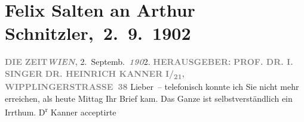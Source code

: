 

         
         \renewcommand{\erwaehntePersonen}{Personen: Heinrich Kanner, Felix Salten, Isidor Singer}
         \renewcommand{\erwaehnteInstitutionen}{Institutionen: Die Zeit}
         \renewcommand{\erwaehnteOrte}{Orte: Leoben, Niederösterreich, Steiermark, Wien, Wipplingerstraße}
         \renewcommand{\erwaehnteWerke}{Werke: Die Zeit, Die griechische Tänzerin. Novellette}
               \section[ Felix Salten an Arthur Schnitzler, 2. 9. 1902]{ Felix Salten an Arthur Schnitzler, 2. 9. 1902}\nopagebreak{}\rehead{ }\begin{ledgroupsized}[t]{13cm}\normalsize\beginnumbering \toendnotes[C]{\smallbreak\pagebreak[2]} 
\toendnotes[C]{\smallbreak}\pstart
           \noindent{}{\pb}\textcolor{gray}{\textbf{DIE}}\pend
           \pstart
           \textcolor{gray}{\textbf{ZEIT}}\hfill \textcolor{gray}{\textbf{\emph{WIEN},}}{ }2. Septemb. \textcolor{gray}{\textbf{\emph{190}}}2.\pend
           \pstart
           \textcolor{gray}{\textbf{\textsc{\textbf{}}}}\pend
           \pstart
           \textcolor{gray}{\textbf{HERAUSGEBER:}}\pend
           \pstart
           \textcolor{gray}{\textbf{\textbf{PROF. DR. I. SINGER}}}\pend
           \pstart
           \textcolor{gray}{\textbf{\textbf{DR. HEINRICH KANNER}}}\pend
           \pstart
           \textcolor{gray}{\textbf{\textbf{}}}\pend
           \pstart
           \textcolor{gray}{\textbf{I/\textsubscript{21},
                           WIPPLINGERSTRASSE 38}}\pend
           \pstart
           Lieber – telefonisch konnte ich Sie nicht mehr erreichen, als heute{ }Mittag Ihr Brief kam. Das Ganze ist selbstverständlich ein Irrthum. D\textsuperscript{r}{ }Kanner acceptirte \label{K_L03333-1v}
\end{ledgroupsized}
